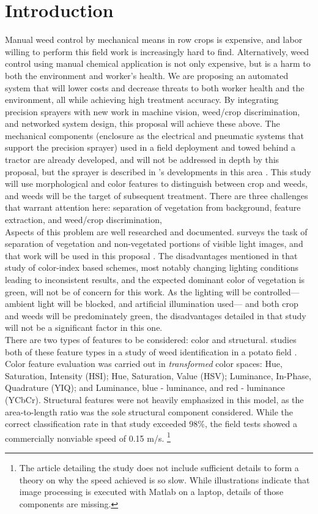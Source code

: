 \documentclass[12pt]{article}
\begin{document}
\section{Introduction}
Manual weed control by mechanical means in row crops is expensive, and labor willing to perform this field work is increasingly hard to find. Alternatively, weed control using manual chemical application is not only expensive, but is a harm to both the environment and worker's health. 
We are proposing an automated system that will lower costs and decrease threats to both worker health and the environment, all while achieving high treatment accuracy.  By integrating precision sprayers with new work in machine vision, weed/crop discrimination, and networked system design, this proposal will achieve these above. The mechanical components (enclosure as the electrical and pneumatic systems that support the precision sprayer) used in a field deployment and towed behind a tractor are already developed, and will not be addressed in depth by this proposal, but the sprayer is described in \citeauthor{Siemens2020-ds}'s developments in this area \parencite{Siemens2020-ds}. 
This study will use morphological and color features to distinguish between crop and weeds, and weeds will be the target of subsequent treatment. There are three challenges that warrant attention here: separation of vegetation from background, feature extraction, and weed/crop discrimination,\\
Aspects of this problem are well researched and documented. \citeauthor{Hamuda2016-dw} surveys the task of separation of vegetation and non-vegetated portions of visible light images, and that work will be used in this proposal \parencite{Hamuda2016-dw}. The disadvantages mentioned in that study of color-index based schemes, most notably changing lighting conditions leading to inconsistent results, and the expected dominant color of vegetation is green, will not be of concern for this work. As the lighting will be controlled---ambient light will be blocked, and artificial illumination used--- and both crop and weeds will be predominately green, the disadvantages detailed in that study will not be a significant factor in this one.\\
There are two types of features to be considered: color and structural. \citeauthor{Sabzi2020-af} studies both of these feature types in a study of weed identification in a potato field \parencite{Sabzi2020-af}. Color feature evaluation was carried out in \textit{transformed} color spaces: Hue, Saturation, Intensity (HSI); Hue, Saturation, Value (HSV); Luminance, In-Phase, Quadrature (YIQ); and Luminance, blue - luminance, and red - luminance (YCbCr). Structural features were not heavily emphasized in this model, as the area-to-length ratio was the sole structural component considered. While the correct classification rate in that study exceeded 98\%, the field tests showed a commercially nonviable speed of 0.15 m/s. \footnote{The article detailing the study does not include sufficient details to form a theory on why the speed achieved is so slow. While illustrations indicate that image processing is executed with Matlab on a laptop, details of those components are missing.} \\
\end{document}
